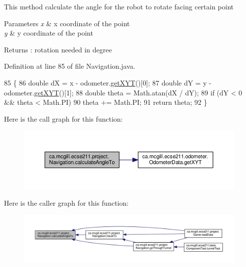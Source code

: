 This method calculate the angle for the robot to rotate facing certain point


\begin{DoxyParams}{Parameters}
{\em x} & x coordinate of the point \\
\hline
{\em y} & y coordinate of the point \\
\hline
\end{DoxyParams}
\begin{DoxyReturn}{Returns}
\+: rotation needed in degree 
\end{DoxyReturn}


Definition at line 85 of file Navigation.\+java.


\begin{DoxyCode}
85                                                      \{
86     \textcolor{keywordtype}{double} dX = x - odometer.\hyperlink{classca_1_1mcgill_1_1ecse211_1_1odometer_1_1_odometer_data_a8f40f0264c68f0cbed4fff1723ae7863}{getXYT}()[0];
87     \textcolor{keywordtype}{double} dY = y - odometer.\hyperlink{classca_1_1mcgill_1_1ecse211_1_1odometer_1_1_odometer_data_a8f40f0264c68f0cbed4fff1723ae7863}{getXYT}()[1];
88     \textcolor{keywordtype}{double} theta = Math.atan(dX / dY);
89     \textcolor{keywordflow}{if} (dY < 0 && theta < Math.PI)
90       theta += Math.PI;
91     \textcolor{keywordflow}{return} theta;
92   \}
\end{DoxyCode}
Here is the call graph for this function\+:\nopagebreak
\begin{figure}[H]
\begin{center}
\leavevmode
\includegraphics[width=350pt]{classca_1_1mcgill_1_1ecse211_1_1project_1_1_navigation_a4376e54162df8f123ca3b52e4fd2f38d_cgraph}
\end{center}
\end{figure}
Here is the caller graph for this function\+:
\nopagebreak
\begin{figure}[H]
\begin{center}
\leavevmode
\includegraphics[width=350pt]{classca_1_1mcgill_1_1ecse211_1_1project_1_1_navigation_a4376e54162df8f123ca3b52e4fd2f38d_icgraph}
\end{center}
\end{figure}

